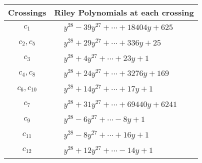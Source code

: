 \documentclass[1p]{elsarticle_modified}
\theoremstyle{definition}
\begin{document}
\begin{tabular}{m{50pt}|m{274pt}}
Crossings & \hspace{64pt}Riley Polynomials at each crossing \\
\hline $$\begin{aligned}c_{1}\end{aligned}$$&$\begin{aligned}
&y^{28}-39 y^{27}+\cdots+18404 y+625
\end{aligned}$\\
\hline $$\begin{aligned}c_{2},c_{5}\end{aligned}$$&$\begin{aligned}
&y^{28}+29 y^{27}+\cdots+336 y+25
\end{aligned}$\\
\hline $$\begin{aligned}c_{3}\end{aligned}$$&$\begin{aligned}
&y^{28}+4 y^{27}+\cdots+23 y+1
\end{aligned}$\\
\hline $$\begin{aligned}c_{4},c_{8}\end{aligned}$$&$\begin{aligned}
&y^{28}+24 y^{27}+\cdots+3276 y+169
\end{aligned}$\\
\hline $$\begin{aligned}c_{6},c_{10}\end{aligned}$$&$\begin{aligned}
&y^{28}+14 y^{27}+\cdots+17 y+1
\end{aligned}$\\
\hline $$\begin{aligned}c_{7}\end{aligned}$$&$\begin{aligned}
&y^{28}+31 y^{27}+\cdots+69440 y+6241
\end{aligned}$\\
\hline $$\begin{aligned}c_{9}\end{aligned}$$&$\begin{aligned}
&y^{28}-6 y^{27}+\cdots-8 y+1
\end{aligned}$\\
\hline $$\begin{aligned}c_{11}\end{aligned}$$&$\begin{aligned}
&y^{28}-8 y^{27}+\cdots+16 y+1
\end{aligned}$\\
\hline $$\begin{aligned}c_{12}\end{aligned}$$&$\begin{aligned}
&y^{28}+12 y^{27}+\cdots-14 y+1
\end{aligned}$\\
\hline
\end{tabular}\\~\\
\end{document}
